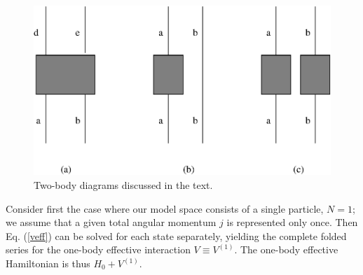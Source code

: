 \documentclass[prc,aps,amsmath,amssymb,preprintnumbers,showpacs,twocolumn]{revtex4}
\begin{document}
%
\begin{figure}[htbp]
 \includegraphics[width=8truecm]{fig1.eps}
\caption{Two-body diagrams discussed in the text.} \label{f1}
\end{figure}
%

Consider first the case where our model space consists of a single particle,
$N=1$;
we assume that a given total angular momentum $j$ is represented only once.
Then Eq. (\ref{veff}) can be solved for each state separately, yielding
the complete folded series for the one-body effective interaction
$V\equiv V^{(1)}$. The one-body effective Hamiltonian is thus 
$H_0+V^{(1)}$.
\end{document}
